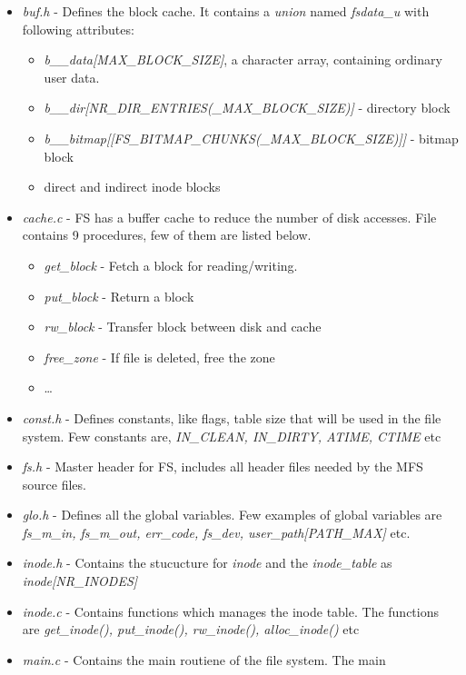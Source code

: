 \begin{itemize} 
\item \emph{buf.h} - Defines the block cache. It contains a \emph{union} named
\emph{fsdata\_u} with following attributes:
     \begin{itemize} 
        \item \emph{b\_\_data[MAX\_BLOCK\_SIZE]}, a character array, containing
        ordinary user data.
        \item
        \emph{b\_\_dir[NR\_DIR\_ENTRIES(\_MAX\_BLOCK\_SIZE)]} - directory block
        \item \emph{b\_\_bitmap[[FS\_BITMAP\_CHUNKS(\_MAX\_BLOCK\_SIZE)]]}
	  	- bitmap block
	  	\item direct and indirect inode blocks
     \end{itemize}
\item \emph{cache.c} - FS has a buffer cache to reduce the number of disk
accesses. File contains 9 procedures, few of them are listed below. 
	\begin{itemize} 
        \item \emph{get\_block} - Fetch a block for reading/writing. 
        \item \emph{put\_block} - Return a block
        \item \emph{rw\_block} - Transfer block between disk and cache
	  	\item \emph{free\_zone} - If file is deleted, free the zone
	  	\item \dots{}
     \end{itemize}
\item \emph{const.h} - Defines constants, like flags, table size that will be
used in the file system. Few constants are, \emph{IN\_CLEAN, IN\_DIRTY, ATIME,
CTIME} etc
\item \emph{fs.h} - Master header for FS, includes all header files needed by
the MFS source files.
\item \emph{glo.h} - Defines all the global variables. Few examples of global
variables are \emph{fs\_m\_in, fs\_m\_out, err\_code, fs\_dev,
user\_path[PATH\_MAX]} etc.
\item \emph{inode.h} - Contains the stucucture for \textit{inode} and the
\textit{inode\_table} as \emph{inode[NR\_INODES]}
\item \emph{inode.c} - Contains functions which manages the inode table. The
functions are \emph{get\_inode(), put\_inode(), rw\_inode(), alloc\_inode()} etc
\item \emph{main.c} - Contains the main routiene of the file system. The main

\end{itemize}
